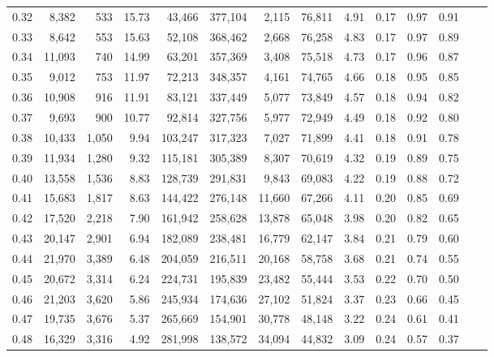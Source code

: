\begin{tabular}{rrrrrrrrrrrrrr}
0.32 &   8,382 &    533 &   15.73 &   43,466 &  377,104 &   2,115 &  76,811 &  4.91 &  0.17 &  0.97 &      0.91 \\
0.33 &   8,642 &    553 &   15.63 &   52,108 &  368,462 &   2,668 &  76,258 &  4.83 &  0.17 &  0.97 &      0.89 \\
0.34 &  11,093 &    740 &   14.99 &   63,201 &  357,369 &   3,408 &  75,518 &  4.73 &  0.17 &  0.96 &      0.87 \\
0.35 &   9,012 &    753 &   11.97 &   72,213 &  348,357 &   4,161 &  74,765 &  4.66 &  0.18 &  0.95 &      0.85 \\
0.36 &  10,908 &    916 &   11.91 &   83,121 &  337,449 &   5,077 &  73,849 &  4.57 &  0.18 &  0.94 &      0.82 \\
0.37 &   9,693 &    900 &   10.77 &   92,814 &  327,756 &   5,977 &  72,949 &  4.49 &  0.18 &  0.92 &      0.80 \\
0.38 &  10,433 &  1,050 &    9.94 &  103,247 &  317,323 &   7,027 &  71,899 &  4.41 &  0.18 &  0.91 &      0.78 \\
0.39 &  11,934 &  1,280 &    9.32 &  115,181 &  305,389 &   8,307 &  70,619 &  4.32 &  0.19 &  0.89 &      0.75 \\
0.40 &  13,558 &  1,536 &    8.83 &  128,739 &  291,831 &   9,843 &  69,083 &  4.22 &  0.19 &  0.88 &      0.72 \\
0.41 &  15,683 &  1,817 &    8.63 &  144,422 &  276,148 &  11,660 &  67,266 &  4.11 &  0.20 &  0.85 &      0.69 \\
0.42 &  17,520 &  2,218 &    7.90 &  161,942 &  258,628 &  13,878 &  65,048 &  3.98 &  0.20 &  0.82 &      0.65 \\
0.43 &  20,147 &  2,901 &    6.94 &  182,089 &  238,481 &  16,779 &  62,147 &  3.84 &  0.21 &  0.79 &      0.60 \\
0.44 &  21,970 &  3,389 &    6.48 &  204,059 &  216,511 &  20,168 &  58,758 &  3.68 &  0.21 &  0.74 &      0.55 \\
0.45 &  20,672 &  3,314 &    6.24 &  224,731 &  195,839 &  23,482 &  55,444 &  3.53 &  0.22 &  0.70 &      0.50 \\
0.46 &  21,203 &  3,620 &    5.86 &  245,934 &  174,636 &  27,102 &  51,824 &  3.37 &  0.23 &  0.66 &      0.45 \\
0.47 &  19,735 &  3,676 &    5.37 &  265,669 &  154,901 &  30,778 &  48,148 &  3.22 &  0.24 &  0.61 &      0.41 \\
0.48 &  16,329 &  3,316 &    4.92 &  281,998 &  138,572 &  34,094 &  44,832 &  3.09 &  0.24 &  0.57 &      0.37 \\

\end{tabular}
